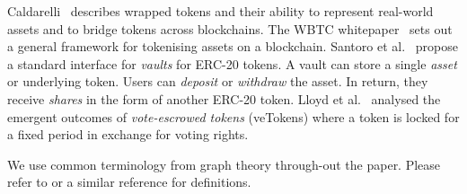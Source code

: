 Caldarelli~\cite{caldarelli-21} describes wrapped tokens and their
ability to represent real-world assets and to bridge tokens across
blockchains.  The WBTC whitepaper~\cite{kyber-et-al-xx} sets out a
general framework for tokenising assets on a blockchain.  Santoro et
al.~\cite{santoro-et-al-22} propose a standard interface for
\textit{vaults} for ERC-20 tokens.  A vault can store a single
\textit{asset} or underlying token.  Users can \textit{deposit} or
\textit{withdraw} the asset.  In return, they receive \textit{shares}
in the form of another ERC-20 token.  Lloyd et
al.~\cite{lloyd-et-al-23} analysed the emergent outcomes of
\textit{vote-escrowed tokens} (veTokens) where a token is locked for a
fixed period in exchange for voting rights.

We use common terminology from graph theory through-out the paper.
Please refer to \cite{diestel-17} or a similar reference for
definitions.
